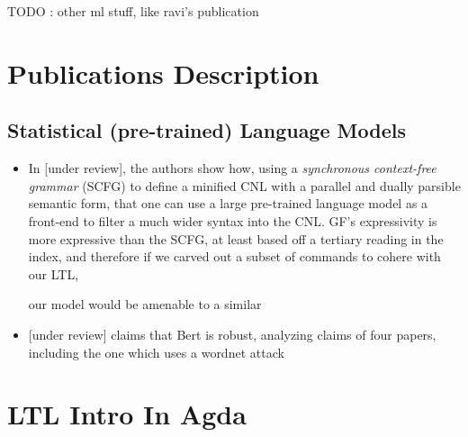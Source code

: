 \documentclass[a4paper, 11pt]{article}
\begin{document}
TODO : other ml stuff, like ravi's publication

\section{Publications Description}

\subsection{Statistical (pre-trained) Language Models}


\begin{itemize}

\item In \cite{fewShotSem} [under review], the authors show how, using a \emph{synchronous
context-free grammar} (SCFG) to define a minified CNL with a parallel and dually
parsible semantic form, that one can use a large pre-trained language model as a front-end
to filter a much wider syntax into the CNL. GF's expressivity is
more expressive than the SCFG, at least based off a tertiary reading in the
index, and therefore if we carved out a subset of commands to cohere with our
LTL,

our model would be amenable to a similar

\item  \cite{hauser2021bert} [under review] claims that Bert is robust, analyzing claims of four
  papers, including the one which uses a wordnet attack

\end{itemize}

\section{LTL Intro In Agda}

\printbibliography
\end{document}
